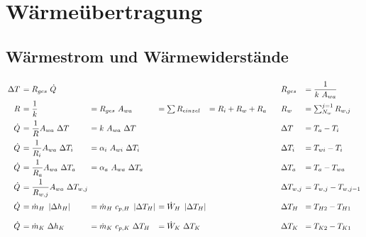 \setcounter{section}{2}

\section{Wärmeübertragung}

\subsection{Wärmestrom und Wärmewiderstände}
	\setlength{\abovedisplayskip}{-20pt}
	\[ \arraycolsep=0.2em  \def\arraystretch{1.8}
	\begin{array}{r l l l l p{1em} l l}
		\Delta T & = R_{ges}\ \dot{Q}                          &                                        &                               &                   &  & R_{ges}        & = \dfrac{1}{k\ A_{wa}}     \\
		R        & = \dfrac{1}{k}                              & = R_{ges} \ A_{wa}                     & = \sum R_{einzel}             & = R_i + R_w + R_a &  & R_w            & = \sum_{N_w}^{j=1} R_{w,j} \\
		\dot{Q}  & = \dfrac{1}{R} A_{wa}\   \Delta T           & = k       \ A_{wa}\ \Delta T           &                               &                   &  & \Delta T       & = T_a - T_i                \\
		\dot{Q}  & = \dfrac{1}{R_i} A_{wa}\ \Delta T_i         & = \alpha_i\ A_{wi}\ \Delta T_i         &                               &                   &  & \Delta T_i     & = T_{wi} - T_i             \\
		\dot{Q}  & = \dfrac{1}{R_a} A_{wa}\ \Delta T_a         & = \alpha_a\ A_{wa}\ \Delta T_a         &                               &                   &  & \Delta T_a     & = T_a - T_{wa}             \\
		\dot{Q}  & = \dfrac{1}{R_{w,j}} A_{wa}\ \Delta T_{w,j} &                                        &                               &                   &  & \Delta T_{w,j} & = T_{w,j} - T_{w,j-1}      \\
		\dot{Q}  & = \dot{m}_H\ \abs{\Delta h_H}               & = \dot{m}_H\ c_{p,H}\ \abs{\Delta T_H} & = \dot{W}_H\ \abs{\Delta T_H} &                   &  & \Delta T_H     & = T_{H2} - T_{H1}          \\
		\dot{Q}  & = \dot{m}_K\ \Delta h_K                     & = \dot{m}_K\ c_{p,K}\ \Delta T_H       & = \dot{W}_K\ \Delta T_K       &                   &  & \Delta T_K     & = T_{K2} - T_{K1}
	\end{array} \]


